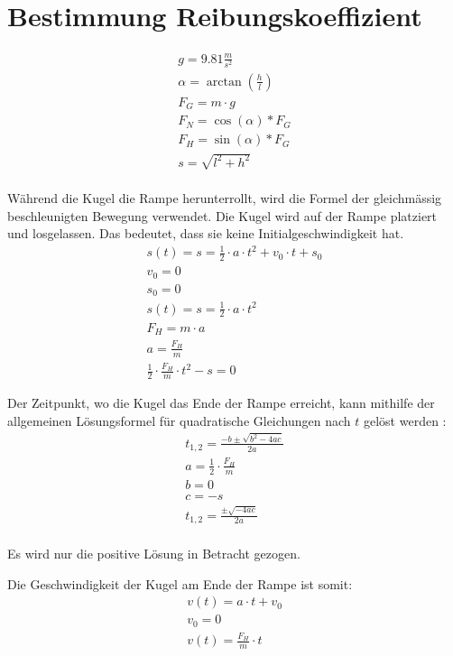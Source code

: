 \section{Bestimmung Reibungskoeffizient}

\begin{align}
    g = 9.81 \frac{m}{s^2}\\
    \alpha = \arctan(\frac{h}{l})\\
    F_G = m \cdot g\\
    F_N = \cos(\alpha) * F_G\\
    F_H = \sin(\alpha) * F_G\\
    s = \sqrt{l^2 + h^2}\\
\end{align}

Während die Kugel die Rampe herunterrollt, wird die Formel der gleichmässig beschleunigten Bewegung verwendet.
Die Kugel wird auf der Rampe platziert und losgelassen. Das bedeutet, dass sie keine Initialgeschwindigkeit hat.
\begin{align}
    s(t) = s = \frac{1}{2} \cdot a \cdot t^2 + v_0 \cdot t + s_0\\
    v_0 = 0\\
    s_0 = 0\\
    s(t) = s = \frac{1}{2} \cdot a \cdot t^2\\
    F_H = m \cdot a\\
    a = \frac{F_H}{m}\\
    \frac{1}{2} \cdot \frac{F_H}{m} \cdot t^2 - s = 0
\end{align}

Der Zeitpunkt, wo die Kugel das Ende der Rampe erreicht, kann mithilfe der allgemeinen Lösungsformel für quadratische Gleichungen nach $t$ gelöst werden \cite{wiki.mitternachtsformel:1}:
\begin{align}
    t_{1,2} = \frac{-b \pm \sqrt{b^2 - 4ac}}{2a}\\
    a = \frac{1}{2} \cdot \frac{F_H}{m}\\
    b = 0\\
    c = -s\\
    t_{1,2} = \frac{\pm \sqrt{-4ac}}{2a}\\
\end{align}

Es wird nur die positive Lösung in Betracht gezogen.

Die Geschwindigkeit der Kugel am Ende der Rampe ist somit:
\begin{align}
    v(t) = a \cdot t + v_0\\
    v_0 = 0\\
    v(t) = \frac{F_H}{m} \cdot t
\end{align}

